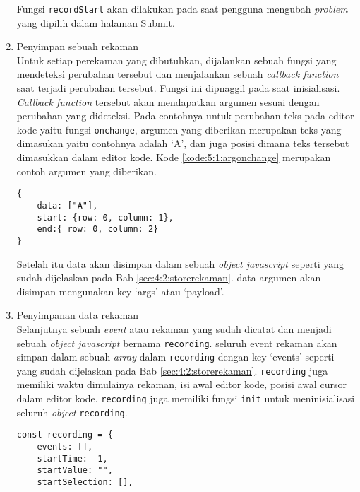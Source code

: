 \begin{enumerate}
    Fungsi \verb|recordStart| akan dilakukan pada saat pengguna mengubah \textit{problem} yang dipilih dalam halaman Submit.


    \item Penyimpan sebuah rekaman \\
    Untuk setiap perekaman yang dibutuhkan, dijalankan sebuah fungsi yang mendeteksi perubahan tersebut dan menjalankan sebuah \textit{callback function} saat terjadi perubahan tersebut. Fungsi ini dipnaggil pada saat inisialisasi. \textit{Callback function} tersebut akan mendapatkan argumen sesuai dengan perubahan yang dideteksi. Pada contohnya untuk perubahan teks pada editor kode yaitu fungsi \verb|onchange|, argumen yang diberikan merupakan teks yang dimasukan yaitu contohnya adalah `A', dan juga posisi dimana teks tersebut dimasukkan dalam editor kode. Kode \ref{kode:5:1:argonchange} merupakan contoh argumen yang diberikan.
    \begin{lstlisting}[caption={Contoh argumen yang diberikan oleh fungsi onchange}, label={kode:5:1:argonchange}]
{
    data: ["A"], 
    start: {row: 0, column: 1}, 
    end:{ row: 0, column: 2}
}
    \end{lstlisting}
    Setelah itu data akan disimpan dalam sebuah \textit{object javascript}
    seperti yang sudah dijelaskan pada Bab \ref{sec:4:2:storerekaman}. data argumen akan disimpan mengunakan key `args' atau `payload'.
    
    \item Penyimpanan data rekaman \\
    Selanjutnya sebuah \textit{event} atau rekaman yang sudah dicatat dan menjadi sebuah \textit{object javascript} bernama \verb|recording|. seluruh event rekaman akan simpan dalam sebuah \textit{array} dalam \verb|recording| dengan key `events' seperti yang sudah dijelaskan pada Bab \ref{sec:4:2:storerekaman}. \verb|recording| juga memiliki waktu dimulainya rekaman, isi awal editor kode, posisi awal cursor dalam editor kode. \verb|recording| juga memiliki fungsi \verb|init| untuk meninisialisasi seluruh \textit{object} \verb|recording|.

    \begin{lstlisting}[caption={Contoh argumen yang diberikan oleh fungsi onchange}, label={kode:5:1:recordingobj}]
const recording = {
    events: [],
    startTime: -1,
    startValue: "",
    startSelection: [],


\end{lstlisting}
\end{enumerate}
